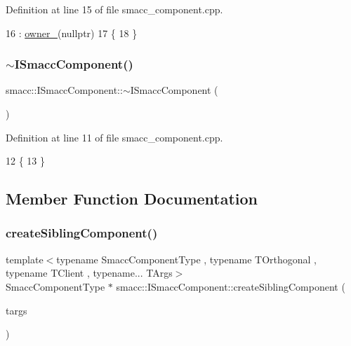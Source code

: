 Definition at line 15 of file smacc\+\_\+component.\+cpp.


\begin{DoxyCode}
16     : \hyperlink{classsmacc_1_1ISmaccComponent_a909590e672450ce0eb0d8facb45c737a}{owner\_}(\textcolor{keyword}{nullptr})
17 \{
18 \}
\end{DoxyCode}
\mbox{\label{classsmacc_1_1ISmaccComponent_a46f5cfc6a308de938b6ee3a5e80a8fe9}} 
\subsubsection{\texorpdfstring{$\sim$\+I\+Smacc\+Component()}{~ISmaccComponent()}}
{\footnotesize\ttfamily smacc\+::\+I\+Smacc\+Component\+::$\sim$\+I\+Smacc\+Component (\begin{DoxyParamCaption}{ }\end{DoxyParamCaption})\hspace{0.3cm}{\ttfamily [virtual]}}



Definition at line 11 of file smacc\+\_\+component.\+cpp.


\begin{DoxyCode}
12 \{
13 \}
\end{DoxyCode}


\subsection{Member Function Documentation}
\mbox{\label{classsmacc_1_1ISmaccComponent_a85a3f70369d18176aa0a28c3ba31b945}} 
\subsubsection{\texorpdfstring{create\+Sibling\+Component()}{createSiblingComponent()}}
{\footnotesize\ttfamily template$<$typename Smacc\+Component\+Type , typename T\+Orthogonal , typename T\+Client , typename... T\+Args$>$ \\
Smacc\+Component\+Type $\ast$ smacc\+::\+I\+Smacc\+Component\+::create\+Sibling\+Component (\begin{DoxyParamCaption}\item[{T\+Args...}]{targs }\end{DoxyParamCaption})\hspace{0.3cm}{\ttfamily [protected]}}



